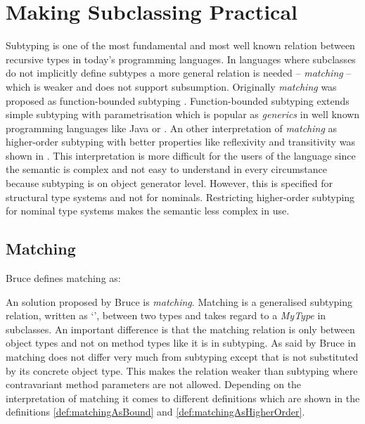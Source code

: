\section{Making Subclassing Practical}
\label{ctr:makingSubclassingPractical}
Subtyping is one of the most fundamental and most well known relation
between recursive types in today's programming languages. In languages
where subclasses do not implicitly define subtypes a more general
relation is needed -- \emph{matching} -- which is weaker and does
not support subsumption. Originally \emph{matching} was proposed as
function-bounded subtyping \cite{canning_f-bounded_1989}. Function-bounded
subtyping extends simple subtyping with parametrisation which is
popular as \emph{generics} in well known programming languages
like Java or \cs \cite{barron-estrada_inheritance_2003}. An other
interpretation of \emph{matching} as higher-order subtyping with
better properties like reflexivity and transitivity was shown in
\cite{abadi_subtyping_1996}. This interpretation is more
difficult for the users of the language since the semantic is complex
and not easy to understand in every circumstance because subtyping is
on object generator level. However, this is specified for structural
type systems and not for nominals. Restricting higher-order subtyping
for nominal type systems makes the semantic less complex in use.

\subsection{Matching}
\label{subsec:matching}
\begin{prop}[Matching]
	\label{prop:matching}
	Bruce defines matching as:
\end{prop}

An solution proposed by Bruce \cite{bruce_binary_1995} is
\emph{matching}. Matching is a generalised subtyping relation, written
as `\match', between two types and takes regard to a \emph{MyType} in
subclasses. An important difference is that the matching relation is only
between object types and not on method types like it is in subtyping. As
said by Bruce in \cite{bruce_foundations_2002} matching does not differ
very much from subtyping except that \mytype is not substituted by its
concrete object type. This makes the relation weaker than subtyping
where contravariant method parameters are not allowed. Depending
on the interpretation of matching it comes to different
definitions which are shown in the definitions
\ref{def:matchingAsBound} and \ref{def:matchingAsHigherOrder}.


